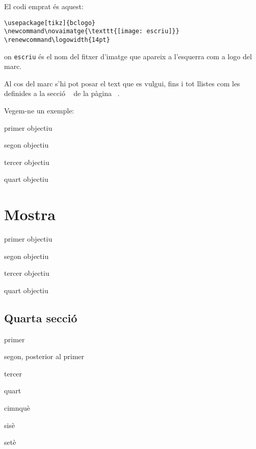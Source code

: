 \documentclass[a4paper,%
                             twoside,%
                             BCOR1.0cm,%
                             DIV11,%
                             parskip=full,%
                             11pt]{scrbook}
\newcommand\novaimatge{\texttt{[image: escriu]}}
\renewcommand\logowidth{14pt}
\begin{document}
El codi emprat és aquest:

\begin{verbatim}
\usepackage[tikz]{bclogo}
\newcommand\novaimatge{\texttt{[image: escriu]}}
\renewcommand\logowidth{14pt}
\end{verbatim}

on \verb+escriu+ és el nom del fitxer d'imatge que apareix a l'esquerra com a logo del marc.

Al cos del marc s'hi pot posar el text que es vulgui, fins i tot llistes com les definides a la secció ~ de la pàgina ~\pageref{sec:llistes}.

Vegem-ne un exemple:

\begin{bclogo}[logo=\novaimatge,couleur=gray!30,barre=none,noborder=true,marge=10,ombre=true,couleurOmbre=black!60,blur]%
{}
\sffamily\scriptsize
\begin{objectius}
\item  primer objectiu
\item segon objectiu
\item tercer objectiu
\item quart objectiu
\end{objectius}
\end{bclogo}


\chapter{Mostra}\label{cap:mostra}
\lipsum[2-3]
\begin{bclogo}[logo=\novaimatge,couleur=gray!30,barre=none,noborder=true,marge=10,ombre=true,couleurOmbre=black!60,blur]%
{}
\sffamily\scriptsize
\begin{fletxes}
\item  primer objectiu
\item segon objectiu
\item tercer objectiu
\item quart objectiu
\end{fletxes}
\end{bclogo}


\lipsum[4]
\section{Quarta secció}\label{sec:quarta}
\lipsum[1]
\begin{passos}
\item  primer
\item  segon, posterior al primer
\item  tercer
\item  quart
\item  cimnquè
\item  sisè
\item  setè
\end{passos}
\end{document}
